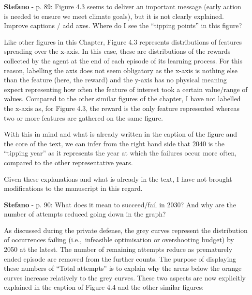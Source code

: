 \documentclass[12pt,a4paper]{article}
\def\ie{i.e.,\ }
\begin{document}
\begin{mdframed}[style=comment] %
{\color{orange} \textbf{Stefano}} - p. 89: Figure 4.3 seems to deliver an important message (early action is needed to ensure we meet climate goals), but it is not clearly explained. Improve captions / add axes. 	Where do I see the ``tipping points'' in this figure?
\end{mdframed}

\noindent Like other figures in this Chapter, Figure 4.3 represents distributions of features spreading over the x-axis. In this case, these are distributions of the rewards collected by the agent at the end of each episode of its learning process. For this reason, labelling the axis does not seem obligatory as the x-axis is nothing else than the feature (here, the reward) and the y-axis has no physical meaning expect representing how often the feature of interest took a certain value/range of values. Compared to the other similar figures of the chapter, I have not labelled the x-axis as, for Figure 4.3, the reward is the only feature represented whereas two or more features are gathered on the same figure.

With this in mind and what is already written in the caption of the figure and the core of the text, we can infer from the right hand side that 2040 is the ``tipping year'' as it represents the year at which the failures occur more often, compared to the other representative years. 

Given these explanations and what is already in the text, I have not brought modifications to the manuscript in this regard.

\begin{mdframed}[style=comment] %
{\color{orange} \textbf{Stefano}} - p. 90: What does it mean to succeed/fail in 2030? And why are the number of attempts reduced going down in the graph?
\end{mdframed}

\noindent As discussed during the private defense, the grey curves represent the distribution of occurrences failing (\ie infeasible optimisation or overshooting  budget) by 2050 at the latest. The number of remaining attempts reduce as prematurely ended episode are removed from the further counts. The purpose of displaying these numbers of ``Total attempts'' is to explain why the areas below the orange curves increase relatively to the grey curves. These two aspects are now explicitly explained {\color{blue}in the caption of Figure 4.4 and the other similar figures}:
\end{document}
